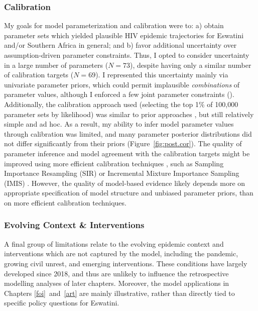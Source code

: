 \subsubsection{Calibration}\label{model.disc.lim.cal}
My goals for model parameterization and calibration were to:
a) obtain parameter sets which yielded plausible HIV epidemic trajectories for
Eswatini and/or Southern Africa in general; and
b) favor additional uncertainty over assumption-driven parameter constraints.
Thus, I opted to consider uncertainty in a large number of parameters ($N = 73$),
despite having only a similar number of calibration targets ($N = 69$).
I represented this uncertainty mainly via univariate parameter priors,
which could permit implausible \emph{combinations} of parameter values,
although I enforced a few joint parameter constraints ().
Additionally, the calibration approach used
(selecting the top 1\% of 100,000 parameter sets by likelihood)
was similar to prior approaches \cite{Johnson2010}, but still relatively simple and ad hoc.
As a result, my ability to infer model parameter values through calibration was limited,
and many parameter posterior distributions did not differ significantly from their priors
(Figure~\ref{fig:post.cor}).
The quality of parameter inference and model agreement with the calibration targets
might be improved using more efficient calibration techniques \cite{Menzies2017}, such as
Sampling Importance Resampling (SIR) \cite{Rubin1987} or
Incremental Mixture Importance Sampling (IMIS) \cite{Raftery2010}.
However, the quality of model-based evidence likely depends
more on appropriate specification of model structure and unbiased parameter priors,
than on more efficient calibration techniques.
\subsubsection{Evolving Context \& Interventions}\label{model.disc.lim.evo}
A final group of limitations relate to the evolving epidemic context and interventions
which are not captured by the model, including
the \covid pandemic, growing civil unrest, and emerging interventions.
These conditions have largely developed since 2018, and thus
are unlikely to influence the retrospective modelling analyses of later chapters.
Moreover, the model applications in Chapters \ref{foi}~and~\ref{art} are mainly illustrative,
rather than directly tied to specific policy questions for Eswatini.
